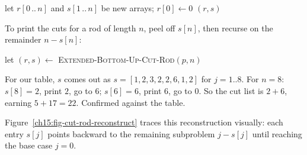 \begin{algorithm}[H]
\caption{\textsc{Extended-Bottom-Up-Cut-Rod}$(p, n)$}
let $r[0\,..\,n]$ and $s[1\,..\,n]$ be new arrays; \quad $r[0]\gets 0$\;
\Return $(r, s)$\;
\end{algorithm}

To print the cuts for a rod of length $n$, peel off $s[n]$, then recurse on the
remainder $n - s[n]$:

\begin{algorithm}[H]
\caption{\textsc{Print-Cut-Rod-Solution}$(p, n)$}
let $(r,s) \gets$ \textsc{Extended-Bottom-Up-Cut-Rod}$(p,n)$\;
\end{algorithm}

For our table, $s$ comes out as $s = [1,2,3,2,2,6,1,2]$ for $j=1..8$. For
$n=8$: $s[8]=2$, print $2$, go to $6$; $s[6]=6$, print $6$, go to $0$. So the
cut list is $2+6$, earning $5+17=22$. Confirmed against the table.

Figure~\ref{ch15:fig-cut-rod-reconstruct} traces this reconstruction visually: each entry $s[j]$ points backward to the remaining subproblem $j - s[j]$ until reaching the base case $j=0$.

